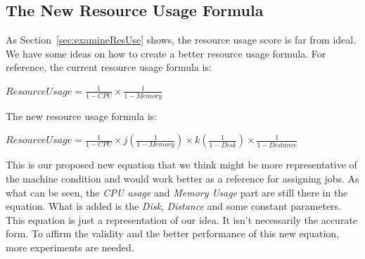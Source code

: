 \subsection{The New Resource Usage Formula}
As Section~\ref{sec:examineResUse} shows, the resource usage score is far from ideal. We have some ideas on how to create a better resource usage formula. For reference, the current resource usage formula is:

\begin{center}
$ResourceUsage = \frac{1}{1-CPU} \times \frac{1}{1-Memory}$
\end{center}

The new resource usage formula is:
\begin{center}
$ResourceUsage = \frac{1}{1-CPU} \times j\left ( \frac{1}{1-Memory} \right ) \times k\left ( \frac{1}{1-Disk} \right ) \times \frac{1}{1-Distance}$
\end{center}

This is our proposed new equation that we think might be more representative of the machine condition and would work better as a reference for assigning jobs. As what can be seen, the \textit{CPU usage} and \textit{Memory Usage} part are still there in the equation. What is added is the \textit{Disk}, \textit{Distance} and some constant parameters. This equation is just a representation of our idea. It isn't necessarily the accurate form. To affirm the validity and the better performance of this new equation, more experiments are needed. 

